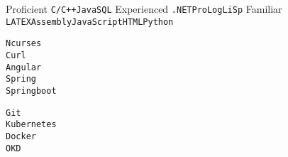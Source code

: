 \documentclass[9pt]{developercv} %
\begin{document}
\vspace{0.5cm}


\begin{minipage}[t]{0.3\textwidth}
	\vspace{-\baselineskip} %

	\begin{entrylist}
	\entry
		{Proficient}
		{}
		{}
		{\texttt{C/C++}\slashsep\texttt{Java}\slashsep\texttt{SQL}}
	\entry
		{Experienced}
		{}
		{}
		{\texttt{.NET}\slashsep\texttt{ProLog}\slashsep\texttt{LiSp}}
	\entry
		{Familiar}
		{}
		{}
		{\texttt{LATEX}\slashsep\texttt{Assembly}\slashsep\texttt{JavaScript}\slashsep\texttt{HTML}\slashsep\texttt{Python}}
	\end{entrylist}
\end{minipage}
\hfill
\begin{minipage}[t]{0.3\textwidth}
	\vspace{-\baselineskip} %
	
	
	{\texttt{Ncurses}\\\texttt{Curl}\\\texttt{Angular}\\\texttt{Spring}\\\texttt{Springboot}}
\end{minipage}
\hfill
\begin{minipage}[t]{0.3\textwidth}
	\vspace{-\baselineskip} %
	
	
	{\texttt{Git}\\\texttt{Kubernetes}\\\texttt{Docker}\\\texttt{OKD}}
\end{minipage}


\end{document}
